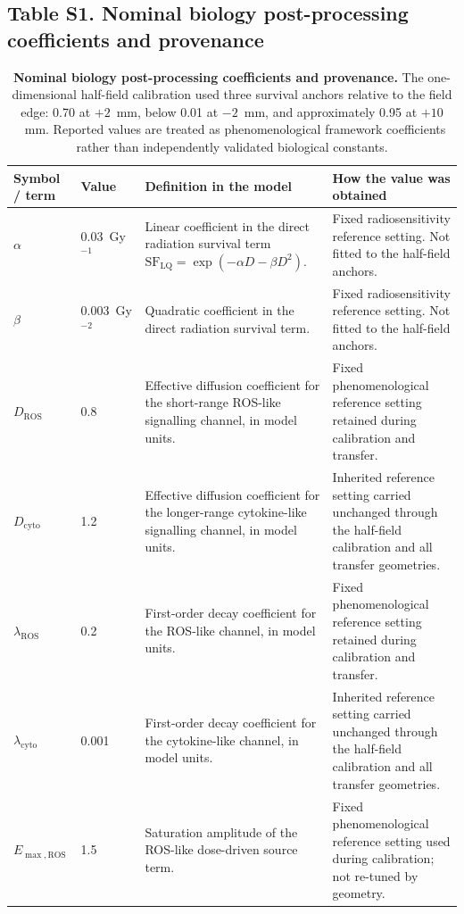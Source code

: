 \documentclass[10pt,a4paper]{article}
\begin{document}
\subsection{Table S1. Nominal biology post-processing coefficients and provenance}
\begin{table}[H]
\centering
\caption{\textbf{Nominal biology post-processing coefficients and provenance.} The one-dimensional half-field calibration used three survival anchors relative to the field edge: 0.70 at $+2$~mm, below 0.01 at $-2$~mm, and approximately 0.95 at $+10$~mm. Reported values are treated as phenomenological framework coefficients rather than independently validated biological constants.}
\label{tab:bio_parameters}
\footnotesize
\setlength{\tabcolsep}{4pt}
\begin{tabularx}{\textwidth}{p{2.7cm}p{1.8cm}p{4.0cm}X}
\toprule
Symbol / term & Value & Definition in the model & How the value was obtained \\
\midrule
$\alpha$ & 0.03~Gy$^{-1}$ & Linear coefficient in the direct radiation survival term $\mathrm{SF}_{\mathrm{LQ}}=\exp(-\alpha D-\beta D^2)$. & Fixed radiosensitivity reference setting. Not fitted to the half-field anchors. \\
$\beta$ & 0.003~Gy$^{-2}$ & Quadratic coefficient in the direct radiation survival term. & Fixed radiosensitivity reference setting. Not fitted to the half-field anchors. \\
$D_{\mathrm{ROS}}$ & 0.8 & Effective diffusion coefficient for the short-range ROS-like signalling channel, in model units. & Fixed phenomenological reference setting retained during calibration and transfer. \\
$D_{\mathrm{cyto}}$ & 1.2 & Effective diffusion coefficient for the longer-range cytokine-like signalling channel, in model units. & Inherited reference setting carried unchanged through the half-field calibration and all transfer geometries. \\
$\lambda_{\mathrm{ROS}}$ & 0.2 & First-order decay coefficient for the ROS-like channel, in model units. & Fixed phenomenological reference setting retained during calibration and transfer. \\
$\lambda_{\mathrm{cyto}}$ & 0.001 & First-order decay coefficient for the cytokine-like channel, in model units. & Inherited reference setting carried unchanged through the half-field calibration and all transfer geometries. \\
$E_{\max,\mathrm{ROS}}$ & 1.5 & Saturation amplitude of the ROS-like dose-driven source term. & Fixed phenomenological reference setting used during calibration; not re-tuned by geometry. \\

\end{tabularx}
\end{table}
\end{document}
